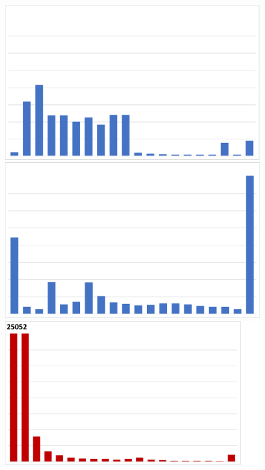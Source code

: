 \begin{figure}
\begin{minipage}[t]{0.66\linewidth}
\begin{framed}
\begin{minipage}[t]{0.24\textwidth}
\vspace{-2mm}
\end{minipage}
\begin{minipage}[t]{0.24\textwidth}%
\includegraphics[width=0.95\linewidth]{results/nyx/Eul100_Max.pdf}
\vspace{-2mm}
\end{minipage}%
\hfill
\begin{minipage}[t]{0.24\textwidth}%
\includegraphics[width=0.95\linewidth]{results/nyx/Eul200_Max.pdf}
\vspace{-2mm}
\end{minipage}
\begin{minipage}[t]{0.24\textwidth}%
\includegraphics[width=0.95\linewidth, trim={0cm 0cm 2.5cm 0cm}, clip]{results/nyx/Lag25_1_AvgL2.pdf}

\end{minipage}
\end{framed}
\end{minipage}
\end{figure}
